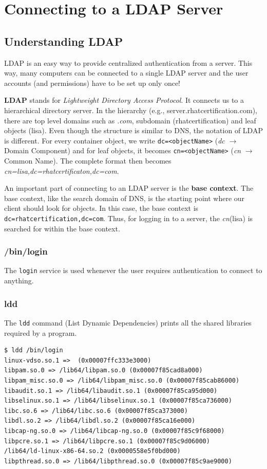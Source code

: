 \chapter{Connecting to a LDAP Server}
\section{Understanding LDAP}
LDAP is an easy way to provide centralized authentication from a server. This way, many computers can be connected to a single LDAP server and the user accounts (and permissions) have to be set up only once!

\textbf{LDAP} stands for \textit{Lightweight Directory Access Protocol}. It connects us to a hierarchical directory server. In the hierarchy (e.g., server.rhatcertification.com), there are top level domains such as \textit{.com}, subdomain (rhatcertification) and leaf objects (lisa). Even though the structure is similar to DNS, the notation of LDAP is different. For every container object, we write \verb|dc=<objectName>| (\textit{dc} $\rightarrow$ Domain Component) and for leaf objects, it becomes \verb|cn=<objectName>| (\textit{cn} $\rightarrow$ Common Name). The complete format then becomes \textit{cn=lisa,dc=rhatcertificaton,dc=com}.

An important part of connecting to an LDAP server is the \textbf{base context}. The base context, like the search domain of DNS, is the starting point where our client should look for objects. In this case, the base context is \verb|dc=rhatcertification,dc=com|. Thus, for logging in to a server, the \textit{cn}(lisa) is searched for within the base context. 

\subsection{/bin/login}
The \verb|login| service is used whenever the user requires authentication to connect to anything. 

\subsection{ldd}
The \verb|ldd| command (List Dynamic Dependencies) prints all the shared libraries required by a program. 

\begin{verbatim}
$ ldd /bin/login
linux-vdso.so.1 =>  (0x00007ffc333e3000)
libpam.so.0 => /lib64/libpam.so.0 (0x00007f85cad8a000)
libpam_misc.so.0 => /lib64/libpam_misc.so.0 (0x00007f85cab86000)
libaudit.so.1 => /lib64/libaudit.so.1 (0x00007f85ca95d000)
libselinux.so.1 => /lib64/libselinux.so.1 (0x00007f85ca736000)
libc.so.6 => /lib64/libc.so.6 (0x00007f85ca373000)
libdl.so.2 => /lib64/libdl.so.2 (0x00007f85ca16e000)
libcap-ng.so.0 => /lib64/libcap-ng.so.0 (0x00007f85c9f68000)
libpcre.so.1 => /lib64/libpcre.so.1 (0x00007f85c9d06000)
/lib64/ld-linux-x86-64.so.2 (0x0000558e5f0bd000)
libpthread.so.0 => /lib64/libpthread.so.0 (0x00007f85c9ae9000)
\end{verbatim}

